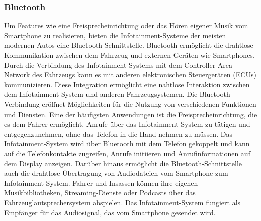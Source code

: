 \subsubsection{Bluetooth}
Um Features wie eine Freisprecheinrichtung oder das Hören eigener Musik vom Smartphone zu realisieren, bieten die Infotainment-Systeme der meisten modernen Autos eine Bluetooth-Schnittstelle. Bluetooth ermöglicht die drahtlose Kommunikation zwischen dem Fahrzeug und externen Geräten wie Smartphones. Durch die Verbindung des Infotainment-Systems mit dem Controller Area Network des Fahrzeugs kann es mit anderen elektronischen Steuergeräten (\acsp{ECU}) kommunizieren. Diese Integration ermöglicht eine nahtlose Interaktion zwischen dem Infotainment-System und anderen Fahrzeugsystemen.
Die Bluetooth-Verbindung eröffnet Möglichkeiten für die Nutzung von verschiedenen Funktionen und Diensten. Eine der häufigsten Anwendungen ist die Freisprecheinrichtung, die es dem Fahrer ermöglicht, Anrufe über das Infotainment-System zu tätigen und entgegenzunehmen, ohne das Telefon in die Hand nehmen zu müssen. Das Infotainment-System wird über Bluetooth mit dem Telefon gekoppelt und kann auf die Telefonkontakte zugreifen, Anrufe initiieren und Anrufinformationen auf dem Display anzeigen.
Darüber hinaus ermöglicht die Bluetooth-Schnittstelle auch die drahtlose Übertragung von Audiodateien vom Smartphone zum Infotainment-System. Fahrer und Insassen können ihre eigenen Musikbibliotheken, Streaming-Dienste oder Podcasts über das Fahrzeuglautsprechersystem abspielen. Das Infotainment-System fungiert als Empfänger für das Audiosignal, das vom Smartphone gesendet wird.


